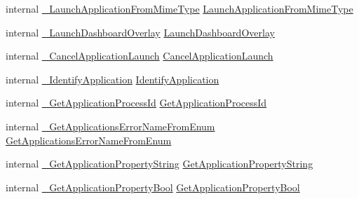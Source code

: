 \begin{DoxyCompactItemize}
\item 
internal \mbox{\hyperlink{struct_valve_1_1_v_r_1_1_i_v_r_applications_afcb2effe091e7d38b37d3eaac945c8ef}{\+\_\+\+Launch\+Application\+From\+Mime\+Type}} \mbox{\hyperlink{struct_valve_1_1_v_r_1_1_i_v_r_applications_a5116017937c5b14018c4ae439e6f0961}{Launch\+Application\+From\+Mime\+Type}}
\item 
internal \mbox{\hyperlink{struct_valve_1_1_v_r_1_1_i_v_r_applications_ac221f4e68eefcfe2a8401a4fe5411d32}{\+\_\+\+Launch\+Dashboard\+Overlay}} \mbox{\hyperlink{struct_valve_1_1_v_r_1_1_i_v_r_applications_aabe60133be581a63b813e20a79c0403f}{Launch\+Dashboard\+Overlay}}
\item 
internal \mbox{\hyperlink{struct_valve_1_1_v_r_1_1_i_v_r_applications_a6717c85896fa77981281c2ad3694d5a5}{\+\_\+\+Cancel\+Application\+Launch}} \mbox{\hyperlink{struct_valve_1_1_v_r_1_1_i_v_r_applications_a245e12d7f137c03224a6b307cda15edd}{Cancel\+Application\+Launch}}
\item 
internal \mbox{\hyperlink{struct_valve_1_1_v_r_1_1_i_v_r_applications_a461680d41f9d889cd818446eb65c113b}{\+\_\+\+Identify\+Application}} \mbox{\hyperlink{struct_valve_1_1_v_r_1_1_i_v_r_applications_a5f943da628af5c0193325edde764cc6a}{Identify\+Application}}
\item 
internal \mbox{\hyperlink{struct_valve_1_1_v_r_1_1_i_v_r_applications_a1ee4e4ced406991223199be10cee99af}{\+\_\+\+Get\+Application\+Process\+Id}} \mbox{\hyperlink{struct_valve_1_1_v_r_1_1_i_v_r_applications_a218daf4956d886a5f521a2e39b5ac2bb}{Get\+Application\+Process\+Id}}
\item 
internal \mbox{\hyperlink{struct_valve_1_1_v_r_1_1_i_v_r_applications_aa203c7e060702643487820541bdca380}{\+\_\+\+Get\+Applications\+Error\+Name\+From\+Enum}} \mbox{\hyperlink{struct_valve_1_1_v_r_1_1_i_v_r_applications_a8be8b2e9d0e661feb907a480498bfd6e}{Get\+Applications\+Error\+Name\+From\+Enum}}
\item 
internal \mbox{\hyperlink{struct_valve_1_1_v_r_1_1_i_v_r_applications_a29be5eea80ac523877cbc8596f8b6f34}{\+\_\+\+Get\+Application\+Property\+String}} \mbox{\hyperlink{struct_valve_1_1_v_r_1_1_i_v_r_applications_ab230508fb654fcdb64ab56fdc133dd91}{Get\+Application\+Property\+String}}
\item 
internal \mbox{\hyperlink{struct_valve_1_1_v_r_1_1_i_v_r_applications_ae970669423f2d1c534e4268eb4421841}{\+\_\+\+Get\+Application\+Property\+Bool}} \mbox{\hyperlink{struct_valve_1_1_v_r_1_1_i_v_r_applications_a44ba301b27c76a75708cd14e9f98c83c}{Get\+Application\+Property\+Bool}}
\item 

\end{DoxyCompactItemize}
